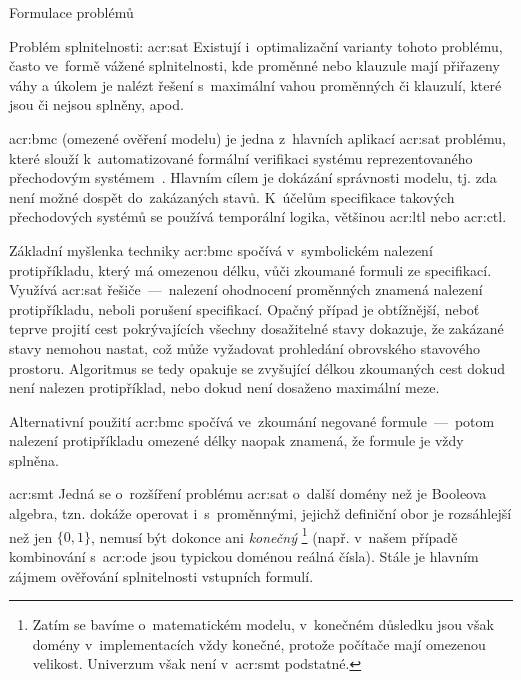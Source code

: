 \documentclass[thesis=M,czech]{FITthesis}[2012/06/26]
\newcommand{\acrlabel}[1]{acr:#1}
\newcommand{\acr}[1]{\acrshort{\acrlabel{#1}}}
\newcommand{\acrf}[1]{\acrfull{\acrlabel{#1}}}
\newcommand{\hl}[1]{\textit{#1}}
\newcommand{\cit}[1]{\cite{#1}}
\begin{document}
\begin{section}{Formulace problémů}
\begin{subsection}{Problém splnitelnosti: \acr{sat}}
Existují i~optimalizační varianty tohoto problému,
často ve~formě vážené splnitelnosti,
kde proměnné nebo klauzule mají přiřazeny váhy
a úkolem je nalézt řešení s~maximální vahou
proměnných či klauzulí, které jsou či nejsou splněny, apod.


\begin{paragraph}{\acrf{bmc}}\label{p:theory:formulation:sat:bmc}
(omezené ověření modelu)
je jedna z~hlavních aplikací \acr{sat} problému,
které slouží k~automatizované formální verifikaci
systému reprezentovaného přechodovým systémem~\cit{bmc-art}.
Hlavním cílem je dokázání správnosti modelu,
tj. zda není možné dospět do~zakázaných stavů.
K~účelům specifikace takových přechodových systémů
se používá temporální logika,
většinou \acr{ltl} nebo \acr{ctl}.

Základní myšlenka techniky \acr{bmc} spočívá
v~symbolickém nalezení protipříkladu,
který má omezenou délku, vůči zkoumané formuli ze specifikací.
Využívá \acr{sat} řešiče~---~nalezení
ohodnocení proměnných znamená nalezení protipříkladu,
neboli porušení specifikací.
Opačný případ je obtížnější,
neboť teprve projití cest pokrývajících všechny dosažitelné stavy
dokazuje, že zakázané stavy nemohou nastat,
což může vyžadovat prohledání obrovského stavového prostoru.
Algoritmus se tedy opakuje se zvyšující délkou zkoumaných cest
dokud není nalezen protipříklad,
nebo dokud není dosaženo maximální meze.

Alternativní použití \acr{bmc} spočívá ve~zkoumání
negované formule~---~potom nalezení protipříkladu
omezené délky naopak znamená,
že formule je vždy splněna.
\end{paragraph} %


\end{subsection} %


\begin{subsection}{\acrf{smt}}\label{ss:theory:formulation:smt}
Jedná se o~rozšíření problému \acr{sat}
o~další domény než je Booleova algebra,
tzn. dokáže operovat i~s~proměnnými,
jejichž definiční obor je rozsáhlejší než jen
${\{0,1\}}$, nemusí být dokonce ani \hl{konečný}%
\footnote{Zatím se bavíme o~matematickém modelu,
v~konečném důsledku jsou však domény v~implementacích
vždy konečné, protože počítače mají omezenou velikost.
Univerzum však není v~\acr{smt} podstatné.}
(např. v~našem případě kombinování s~\acr{ode}
jsou typickou doménou reálná čísla).
Stále je hlavním zájmem ověřování
splnitelnosti vstupních formulí.


\end{subsection}
\end{section}
\end{document}

